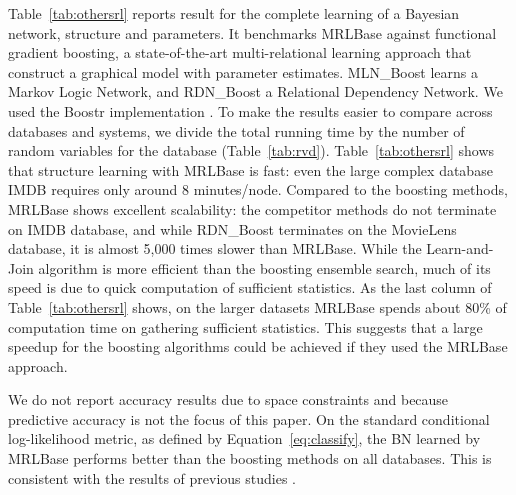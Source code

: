 \documentclass{acm_proc_article-sp}
\begin{document}
Table~\ref{tab:othersrl} reports result for the complete learning of a Bayesian network, structure and parameters. It benchmarks MRLBase against functional gradient boosting, a state-of-the-art  multi-relational learning approach that construct a graphical model with parameter estimates\cite{Natarajan2012}. MLN\_Boost learns a Markov Logic Network, and RDN\_Boost a Relational Dependency Network. 
We used the Boostr implementation \cite{Khot2013}. 
To make the results easier to compare across databases and systems, we divide the total running time by the number of random variables for the database (Table~\ref{tab:rvd}). 
Table~\ref{tab:othersrl} shows that structure learning with MRLBase is fast: even the large complex database IMDB requires only around 8 minutes/node. Compared to the boosting methods, MRLBase shows excellent scalability: the competitor methods do not terminate on IMDB database, and while RDN\_Boost terminates on the MovieLens database, it is almost 5,000 times slower than MRLBase. While the Learn-and-Join algorithm is more efficient than the boosting ensemble search, much of its speed is due to quick computation of sufficient statistics. As the last column of Table~\ref{tab:othersrl} shows, on the larger datasets MRLBase spends about 80\% of computation time on gathering sufficient statistics. This suggests that a large  speedup for the boosting algorithms could be achieved if they used the MRLBase approach. 

We do not report accuracy results due to space constraints and because predictive accuracy is not the focus of this paper. On the standard conditional log-likelihood metric, as defined by Equation~\ref{eq:classify}, the BN learned by MRLBase performs better than the boosting methods on all databases. This is consistent with the results of previous studies \cite{Schulte2012}.

\begin{table}[htbp]
  \centering
        \caption{Learning Time Comparison with other multi-relational learning systems. Unless otherwise noted, times are in seconds.}
  \label{tab:othersrl}%
\end{table}%
\end{document}
